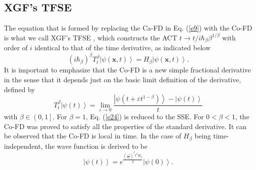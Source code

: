 \documentclass[
showpacs,  %
showkeys,  %
aps,       %
amsthm,    %
amsmath,   %
amsfonts,  %
amssymb    %
]{revtex4-1}          %
\begin{document}
\subsection{XGF's TFSE}
\label{subsec:33}
The equation that is formed by replacing the Ca-FD \cite{Mainardi1996} in Eq. (\ref{e9}) with the Co-FD \cite{Khalil2014} is what we call XGF's TFSE \cite{Xiang2019}, which constructs the ACT $t\to t/i\hbar_\beta {\beta^{1/\beta}}$ with order of $i$ identical to that of the time derivative, as indicated below
\begin{equation}
\label{e24}
{(i\hbar_\beta)^\beta}T_t^\beta \left| {\psi (\boldsymbol{x},t)} \right\rangle= {H_\beta }\left| {\psi (\boldsymbol{x},t)} \right\rangle.
\end{equation}
It is important to emphasize that the Co-FD is a new simple fractional derivative in the sense that it depends just on the basic limit definition of the derivative, defined by
\begin{equation}
\label{e25}
T_t^\beta \left| {\psi (t)} \right\rangle  = \mathop {\lim }\limits_{\varepsilon  \to 0} \frac{{\left| {\psi (t + \varepsilon {t^{1 - \beta }})} \right\rangle - \left| {\psi (t)} \right\rangle }}{t}
\end{equation}
with $\beta\in\left({0,1}\right]$. For $\beta=1$, Eq. (\ref{e24}) is reduced to the SSE. For $0<\beta<1$, the Co-FD was proved to satisfy all the properties of the standard derivative. It can be observed that the Co-FD is local in time. In the case of ${H_\beta}$ being time-independent, the wave function is derived to be
\begin{equation}
\label{e26}
\left| {\psi(t)} \right\rangle = {e^{\frac{{{{(\frac{{ - i}}{{{\hbar _\beta}}})}^\beta}{t^\beta}{H_\beta }}}{\beta}}}\left| {\psi(0)} \right\rangle.
\end{equation}
\end{document}
